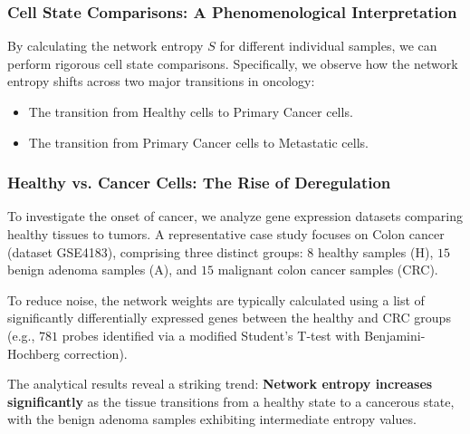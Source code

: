 
\subsubsection{Cell State Comparisons: A Phenomenological Interpretation}
\label{subsubsec:cell_state_comparisons}

By calculating the network entropy \(S\) for different individual samples, we can perform rigorous cell state comparisons. Specifically, we observe how the network entropy shifts across two major transitions in oncology:
\begin{itemize}
    \item The transition from Healthy cells to Primary Cancer cells.
    \item The transition from Primary Cancer cells to Metastatic cells.
\end{itemize}

\subsubsection{Healthy vs. Cancer Cells: The Rise of Deregulation}
\label{subsubsec:healthy_vs_cancer}

To investigate the onset of cancer, we analyze gene expression datasets comparing healthy tissues to tumors. A representative case study focuses on Colon cancer (dataset GSE4183), comprising three distinct groups: \(8\) healthy samples (H), \(15\) benign adenoma samples (A), and \(15\) malignant colon cancer samples (CRC).

To reduce noise, the network weights are typically calculated using a list of significantly differentially expressed genes between the healthy and CRC groups (e.g., \(781\) probes identified via a modified Student's T-test with Benjamini-Hochberg correction).

The analytical results reveal a striking trend: \textbf{Network entropy increases significantly} as the tissue transitions from a healthy state to a cancerous state, with the benign adenoma samples exhibiting intermediate entropy values.


